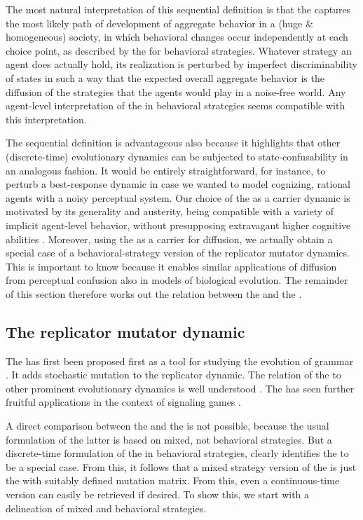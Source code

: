 \documentclass[fleqn,reqno,10pt]{article}
\newcommand{\rd}{\acro{rd}} %
\newcommand{\rmd}{\acro{rmd}} %
\newcommand{\rdd}{\acro{rdd}} %
\begin{document}
The most natural interpretation of this sequential definition is that
the \rdd captures the most likely path of development of aggregate
behavior in a (huge \& homogeneous) society, in which behavioral
changes occur independently at each choice point, as described by the
\rd for behavioral strategies. Whatever strategy an agent does
actually hold, its realization is perturbed by imperfect
discriminability of states in such a way that the expected overall
aggregate behavior is the diffusion of the strategies that the agents
would play in a noise-free world. Any agent-level interpretation of
the \rd in behavioral strategies seems compatible with this
interpretation.

The sequential definition is advantageous also because it highlights
that other (discrete-time) evolutionary dynamics can be subjected to
state-confusability in an analogous fashion. It would be entirely
straightforward, for instance, to perturb a best-response dynamic in
case we wanted to model cognizing, rational agents with a noisy
perceptual system. Our choice of the \rd as a carrier dynamic is
motivated by its generality and austerity, being compatible with a
variety of implicit agent-level behavior, without presupposing
extravagant higher cognitive abilities
\citep[c.f.][]{Sandholm2013:Population-Game}. Moreover, using the \rd
as a carrier for diffusion, we actually obtain a special case of a
behavioral-strategy version of the replicator mutator dynamics. This
is important to know because it enables similar applications of
diffusion from perceptual confusion also in models of biological
evolution. The remainder of this section therefore works out the
relation between the \rdd and the \rmd.

\subsection{The replicator mutator dynamic}
\label{sec:repl-mutat-dynam}

The \rmd has first been proposed first as a tool for studying the
evolution of grammar
\citep[e.g.][]{KomarovaNiyogi2001:The-Evolutionar,NowakKomarova2001:Evolution-of-Un}. It
adds stochastic mutation to the replicator dynamic. The relation of
the \rmd to other prominent evolutionary dynamics is well understood
\citep{PageNowak2002:Unifying-Evolut}. The \rmd has seen further
fruitful applications in the context of signaling games
\citep[e.g.][]{HutteggerSkyrms2010:Evolutionary-Dy}.

A direct comparison between the \rdd and the \rmd is not possible,
because the usual formulation of the latter is based on mixed, not
behavioral strategies. But a discrete-time formulation of the \rmd in
behavioral strategies, clearly identifies the \rdd to be a special
case. From this, it follows that a mixed strategy version of the \rdd
is just the \rmd with suitably defined mutation matrix. From this,
even a continuous-time version can easily be retrieved if desired. To
show this, we start with a delineation of mixed and behavioral
strategies.
\end{document}
